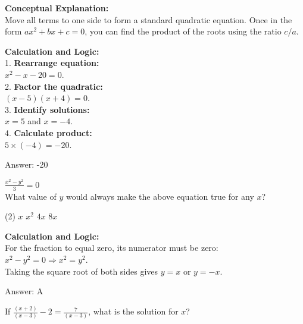 \documentclass[11pt,paper=a4,answers]{exam}
\begin{document}
\begin{questions}
\begin{solution}
\textbf{Conceptual Explanation:} \\
Move all terms to one side to form a standard quadratic equation. Once in the form $ax^2 + bx + c = 0$, you can find the product of the roots using the ratio $c/a$.

\vspace{30pt}

\textbf{Calculation and Logic:} \\
1. \textbf{Rearrange equation:} \\
   $x^2 - x - 20 = 0$. \\
2. \textbf{Factor the quadratic:} \\
   $(x - 5)(x + 4) = 0$. \\
3. \textbf{Identify solutions:} \\
   $x = 5$ and $x = -4$. \\
4. \textbf{Calculate product:} \\
   $5 \times (-4) = -20$.

\vspace{30pt}

Answer: \colorbox{yellow!100}{-20}
\end{solution}

\vspace{60pt}

\question
$\frac{x^2 - y^2}{3} = 0$ \\
What value of $y$ would always make the above equation true for any $x$?
\begin{tasks}(2)
    \task $x$
    \task $x^2$
    \task $4x$
    \task $8x$
\end{tasks}

\begin{solution}
\textbf{Calculation and Logic:} \\
For the fraction to equal zero, its numerator must be zero: \\
$x^2 - y^2 = 0 \Rightarrow x^2 = y^2$. \\
Taking the square root of both sides gives $y = x$ or $y = -x$.

\vspace{30pt}

Answer: \colorbox{yellow!100}{A}
\end{solution}

\vspace{60pt}

\question
If $\frac{(x + 2)}{(x - 3)} - 2 = \frac{7}{(x - 3)}$, what is the solution for $x$?


\end{questions}
\end{document}
